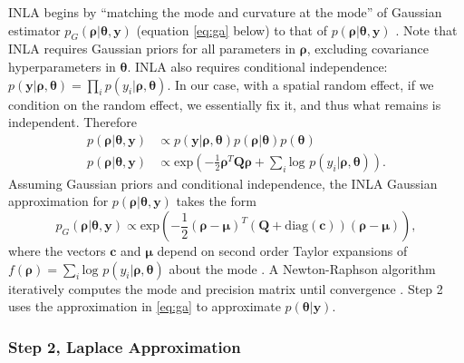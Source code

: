 INLA begins by ``matching the mode and curvature at the mode'' of Gaussian estimator $p_{G}(\pmb{\rho}|\pmb{\theta}, \pmb{y})$ (equation \ref{eq:ga} below) to that of $p(\pmb{\rho}|\pmb{\theta}, \pmb{y})$ \citep{Rue2005}. Note that INLA requires Gaussian priors for all parameters in $\pmb{\rho}$, excluding covariance hyperparameters in $\pmb{\theta}$. INLA also requires conditional independence: $p(\pmb{y}|\pmb{\rho}, \pmb{\theta}) = \prod_{i} p(y_{i}|\pmb{\rho},\pmb{\theta})$. In our case, with a spatial random effect, if we condition on the random effect, we essentially fix it, and thus what remains is independent. Therefore 
\begin{align}
p(\pmb{\rho} |\pmb{\theta},\pmb{y}) & \propto p(\pmb{y}|\pmb{\rho}, \pmb{\theta}) p(\pmb{\rho}|\pmb{\theta}) p(\pmb{\theta}) \nonumber \\
p(\pmb{\rho}|\pmb{\theta},\pmb{y}) & \propto \text{exp}\left(-\frac{1}{2}\pmb{\rho}^{T}\pmb{Q \rho} + \sum_{i} \text{log }p(y_{i}|\pmb{\rho},\pmb{\theta}) \right). \nonumber
\end{align}
Assuming Gaussian priors and conditional independence, the INLA Gaussian approximation for $p(\pmb{\rho}|\pmb{\theta}, \pmb{y})$ takes the form
\begin{equation} \label{eq:ga}
p_{G}(\pmb{\rho}|\pmb{\theta},\pmb{y}) \propto \text{exp} \left( -\frac{1}{2}(\pmb{\rho-\mu})^{T} (\pmb{Q} + \text{diag}(\pmb{c}) ) (\pmb{\rho - \mu}) \right),
\end{equation}
where the vectors $\pmb{c}$ and $\pmb{\mu}$ depend on second order Taylor expansions of $f(\pmb{\rho}) = \sum_{i} \text{log }p(y_{i}|\pmb{\rho},\pmb{\theta})$ about the mode \citep{Lindstrom2014}. A Newton-Raphson algorithm iteratively computes the mode and precision matrix until convergence \citep{Rue2009}. Step 2 uses the approximation in \ref{eq:ga} to approximate $p(\pmb{\theta}|\pmb{y})$.

\subsubsection{Step 2, Laplace Approximation}  %

